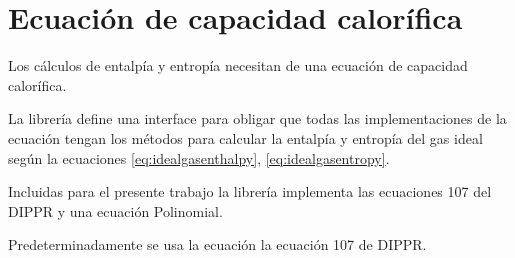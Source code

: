\section{Ecuación de capacidad calorífica}\label{sec:cp}

	Los cálculos de entalpía y entropía necesitan de una ecuación de capacidad calorífica.

	La librería \Materia  define una interface para obligar que todas las implementaciones de la ecuación tengan los métodos para calcular la entalpía y entropía del gas ideal según la ecuaciones \ref{eq:idealgasenthalpy}, \ref{eq:idealgasentropy}.

	Incluidas para el presente trabajo la librería \Materia implementa las ecuaciones 107 del DIPPR y una ecuación Polinomial. 
	
	Predeterminadamente se usa la ecuación la ecuación 107 de DIPPR.